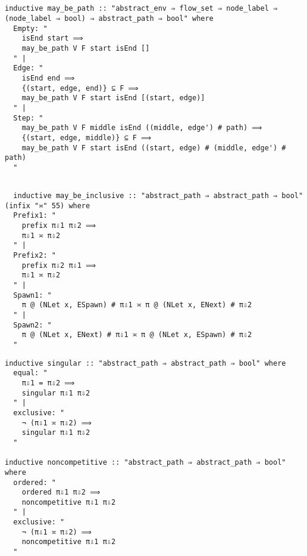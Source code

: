 \documentclass{article}
\begin{document}
\begin{lstlisting}[style=codestyle1, escapechar=\%]

  
inductive may_be_path :: "abstract_env ⇒ flow_set ⇒ node_label ⇒ (node_label ⇒ bool) ⇒ abstract_path ⇒ bool" where
  Empty: "
    isEnd start ⟹
    may_be_path V F start isEnd []
  " |
  Edge: "
    isEnd end ⟹
    {(start, edge, end)} ⊆ F ⟹
    may_be_path V F start isEnd [(start, edge)]
  " |
  Step: "
    may_be_path V F middle isEnd ((middle, edge') # path) ⟹
    {(start, edge, middle)} ⊆ F ⟹
    may_be_path V F start isEnd ((start, edge) # (middle, edge') # path)
  "
  \end{lstlisting}

\begin{lstlisting}[style=codestyle1, escapechar=\%]

  inductive may_be_inclusive :: "abstract_path ⇒ abstract_path ⇒ bool" (infix "≍" 55) where
  Prefix1: "
    prefix π⇩1 π⇩2 ⟹
    π⇩1 ≍ π⇩2
  " |
  Prefix2: "
    prefix π⇩2 π⇩1 ⟹
    π⇩1 ≍ π⇩2
  " |
  Spawn1: "
    π @ (NLet x, ESpawn) # π⇩1 ≍ π @ (NLet x, ENext) # π⇩2
  " |
  Spawn2: "
    π @ (NLet x, ENext) # π⇩1 ≍ π @ (NLet x, ESpawn) # π⇩2
  "
  \end{lstlisting}

\begin{lstlisting}[style=codestyle1, escapechar=\%]
  inductive singular :: "abstract_path ⇒ abstract_path ⇒ bool" where
  equal: "
    π⇩1 = π⇩2 ⟹ 
    singular π⇩1 π⇩2
  " |
  exclusive: "
    ¬ (π⇩1 ≍ π⇩2) ⟹ 
    singular π⇩1 π⇩2
  "

inductive noncompetitive :: "abstract_path ⇒ abstract_path ⇒ bool" where
  ordered: "
    ordered π⇩1 π⇩2 ⟹ 
    noncompetitive π⇩1 π⇩2
  " |
  exclusive: "
    ¬ (π⇩1 ≍ π⇩2) ⟹ 
    noncompetitive π⇩1 π⇩2
  "
  \end{lstlisting}
\end{document}
